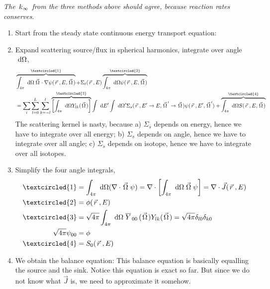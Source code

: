 \documentclass{school-22.211-notes}
\begin{document}
\textit{The $\left. k_{\infty} \right.$ from the three methods above should agree, because reaction rates conserves}.


\clearpage
{}
\begin{enumerate}
\item Start from the steady state continuous energy transport equation: 

\item Expand scattering source/flux in spherical harmonics, integrate over angle $\mbox{ }\mathrm{d} \Omega$,
\begin{align}
 &\overbrace{\int_{4\pi} \dOmega \vecOmega \cdot \gradient \psi(\vecr, E, \vecOmega)}^{\textcircled{1}} 
+ \Sigma_t (\vecr, E) \overbrace{\int_{4\pi} \dOmega \psi(\vecr, E, \vecOmega)}^{\textcircled{2}} \\
&= \Sum_i \Sum_{l=0}^L \Sum_{k=-l}^l \overbrace{\left[\int_{4\pi} \dOmega Y_{lk} (\vecOmega) \right]}^{\textcircled{3}} \int \dE' \int \dOmega' \Sigma_s(\vecr, E'\to E, \vecOmega' \to \vecOmega) \psi(\vecr, E', \vecOmega') + \overbrace{\int_{4\pi} \dOmega S(\vecr, E, \vecOmega)}^{\textcircled{4}} 
\end{align}
The scattering kernel is nasty, because a) $\Sigma_s$ depends on energy, hence we have to integrate over all energy; b) $\Sigma_s$ depends on angle, hence we have to integrate over all angle; c) $\Sigma_s$ depends on isotope, hence we have to integrate over all isotopes. 

\item Simplify the four angle integrals,
\begin{align}
\textcircled{1} &= \int_{4\pi} \dOmega (\divergence \vecOmega \psi) = \divergence \left[\int_{4\pi} \dOmega \vecOmega \psi \right] = \divergence \vec{J} (\vecr, E) \\
\textcircled{2} &= \phi(\vecr, E) \\
\textcircled{3} &= \sqrt{4\pi} \int_{4\pi} \dOmega \bar{Y}_{00}(\vecOmega) Y_{lk} (\vecOmega) = \sqrt{4\pi} \delta_{l0}\delta_{k0} \\
\sqrt{4 \pi } \psi_{00} &= \phi \\
\textcircled{4} &= S_0 (\vecr, E) 
\end{align}

\item We obtain the balance equation:
This balance equation is basically equalling the source and the sink. Notice this equation is exact so far. But since we do not know what $\vec{J}$ is, we need to approximate it somehow. 
\end{enumerate}
\end{document}
